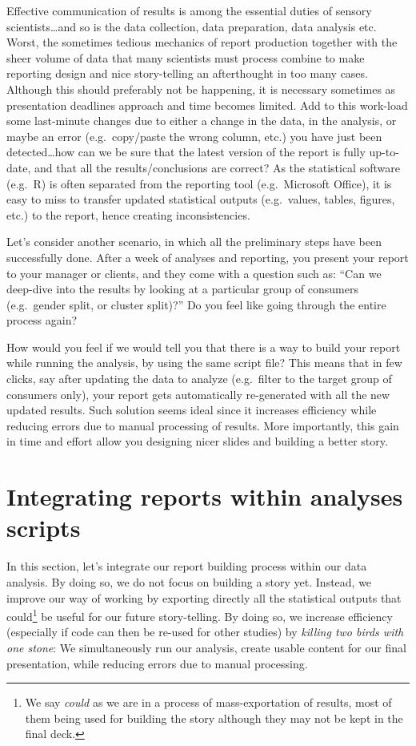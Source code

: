 \documentclass[
]{krantz}
\begin{document}
Effective communication of results is among the essential duties of sensory scientists\ldots and so is the data collection, data preparation, data analysis etc. Worst, the sometimes tedious mechanics of report production together with the sheer volume of data that many scientists must process combine to make reporting design and nice story-telling an afterthought in too many cases.
Although this should preferably not be happening, it is necessary sometimes as presentation deadlines approach and time becomes limited.
Add to this work-load some last-minute changes due to either a change in the data, in the analysis, or maybe an error (e.g.~copy/paste the wrong column, etc.) you have just been detected\ldots how can we be sure that the latest version of the report is fully up-to-date, and that all the results/conclusions are correct? As the statistical software (e.g.~R) is often separated from the reporting tool (e.g.~Microsoft Office), it is easy to miss to transfer updated statistical outputs (e.g.~values, tables, figures, etc.) to the report, hence creating inconsistencies.

Let's consider another scenario, in which all the preliminary steps have been successfully done. After a week of analyses and reporting, you present your report to your manager or clients, and they come with a question such as: ``Can we deep-dive into the results by looking at a particular group of consumers (e.g.~gender split, or cluster split)?'' Do you feel like going through the entire process again?

How would you feel if we would tell you that there is a way to build your report while running the analysis, by using the same script file? This means that in few clicks, say after updating the data to analyze (e.g.~filter to the target group of consumers only), your report gets automatically re-generated with all the new updated results. Such solution seems ideal since it increases efficiency while reducing errors due to manual processing of results. More importantly, this gain in time and effort allow you designing nicer slides and building a better story.

\hypertarget{integrating-reports-within-analyses-scripts}{%
\section{Integrating reports within analyses scripts}\label{integrating-reports-within-analyses-scripts}}

In this section, let's integrate our report building process within our data analysis. By doing so, we do not focus on building a story yet. Instead, we improve our way of working by exporting directly all the statistical outputs that could\footnote{We say \emph{could} as we are in a process of mass-exportation of results, most of them being used for building the story although they may not be kept in the final deck.} be useful for our future story-telling. By doing so, we increase efficiency (especially if code can then be re-used for other studies) by \emph{killing two birds with one stone}: We simultaneously run our analysis, create usable content for our final presentation, while reducing errors due to manual processing.
\end{document}
